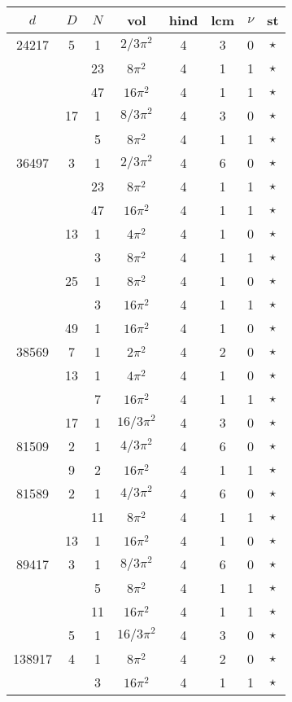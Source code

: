 \documentclass[12pt]{amsart}
\providecommand{\DIFadd}[1]{{\protect\color{blue}\uwave{#1}}} %
\providecommand{\DIFdel}[1]{{\protect\color{red}\sout{#1}}}                      %
\providecommand{\DIFaddbegin}{} %
\providecommand{\DIFaddend}{} %
\providecommand{\DIFdelbegin}{} %
\providecommand{\DIFdelend}{} %
\begin{document}
\begin{tabular}{ccc|ccccc}
$d$ & $D$ & $N$ & vol & hind & lcm & $\nu$ & st\\
\hline
24217 & 5 & 1 & \DIFdelbegin \DIFdel{$2/3\pi^2$ }\DIFdelend \DIFaddbegin \DIFadd{$(2/3)\pi^2$ }\DIFaddend & 4 & 3 & 0 & $\star$ \\
 &  & 23 & $8\pi^2$ & 4 & 1 & 1 & $\star$ \\
 &  & 47 & $16\pi^2$ & 4 & 1 & 1 & $\star$ \\
 & 17 & 1 & \DIFdelbegin \DIFdel{$8/3\pi^2$ }\DIFdelend \DIFaddbegin \DIFadd{$(8/3)\pi^2$ }\DIFaddend & 4 & 3 & 0 & $\star$ \\
 &  & 5 & $8\pi^2$ & 4 & 1 & 1 & $\star$ \\
36497 & 3 & 1 & \DIFdelbegin \DIFdel{$2/3\pi^2$ }\DIFdelend \DIFaddbegin \DIFadd{$(2/3)\pi^2$ }\DIFaddend & 4 & 6 & 0 & $\star$ \\
 &  & 23 & $8\pi^2$ & 4 & 1 & 1 & $\star$ \\
 &  & 47 & $16\pi^2$ & 4 & 1 & 1 & $\star$ \\
 & 13 & 1 & $4\pi^2$ & 4 & 1 & 0 & $\star$ \\
 &  & 3 & $8\pi^2$ & 4 & 1 & 1 & $\star$ \\
 & 25 & 1 & $8\pi^2$ & 4 & 1 & 0 & $\star$ \\
 &  & 3 & $16\pi^2$ & 4 & 1 & 1 & $\star$ \\
 & 49 & 1 & $16\pi^2$ & 4 & 1 & 0 & $\star$ \\
38569 & 7 & 1 & $2\pi^2$ & 4 & 2 & 0 & $\star$ \\
 & 13 & 1 & $4\pi^2$ & 4 & 1 & 0 & $\star$ \\
 &  & 7 & $16\pi^2$ & 4 & 1 & 1 & $\star$ \\
 & 17 & 1 & \DIFdelbegin \DIFdel{$16/3\pi^2$ }\DIFdelend \DIFaddbegin \DIFadd{$(16/3)\pi^2$ }\DIFaddend & 4 & 3 & 0 & $\star$ \\
81509 & 2 & 1 & \DIFdelbegin \DIFdel{$4/3\pi^2$ }\DIFdelend \DIFaddbegin \DIFadd{$(4/3)\pi^2$ }\DIFaddend & 4 & 6 & 0 & $\star$ \\
 & 9 & 2 & $16\pi^2$ & 4 & 1 & 1 & $\star$ \\
81589 & 2 & 1 & \DIFdelbegin \DIFdel{$4/3\pi^2$ }\DIFdelend \DIFaddbegin \DIFadd{$(4/3)\pi^2$ }\DIFaddend & 4 & 6 & 0 & $\star$ \\
 &  & 11 & $8\pi^2$ & 4 & 1 & 1 & $\star$ \\
 & 13 & 1 & $16\pi^2$ & 4 & 1 & 0 & $\star$ \\
89417 & 3 & 1 & \DIFdelbegin \DIFdel{$8/3\pi^2$ }\DIFdelend \DIFaddbegin \DIFadd{$(8/3)\pi^2$ }\DIFaddend & 4 & 6 & 0 & $\star$ \\
 &  & 5 & $8\pi^2$ & 4 & 1 & 1 & $\star$ \\
 &  & 11 & $16\pi^2$ & 4 & 1 & 1 & $\star$ \\
 & 5 & 1 & \DIFdelbegin \DIFdel{$16/3\pi^2$ }\DIFdelend \DIFaddbegin \DIFadd{$(16/3)\pi^2$ }\DIFaddend & 4 & 3 & 0 & $\star$ \\
138917 & 4 & 1 & $8\pi^2$ & 4 & 2 & 0 & $\star$ \\
 &  & 3 & $16\pi^2$ & 4 & 1 & 1 & $\star$ \\
\end{tabular}
\end{document}
